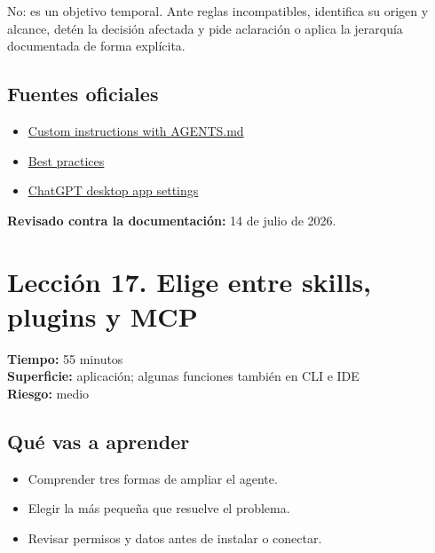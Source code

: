 \documentclass[10pt,a4paper,openany]{book}
\providecommand{\tightlist}{\setlength{\itemsep}{0.18em}\setlength{\parskip}{0pt}}
\begin{document}
No: es un objetivo temporal. Ante reglas incompatibles, identifica su
origen y alcance, detén la decisión afectada y pide aclaración o aplica
la jerarquía documentada de forma explícita.

\subsection{Fuentes oficiales}\label{fuentes-oficiales-15}

\begin{itemize}
\tightlist
\item
  \href{https://learn.chatgpt.com/docs/agent-configuration/agents-md}{Custom
  instructions with AGENTS.md}
\item
  \href{https://learn.chatgpt.com/guides/best-practices}{Best practices}
\item
  \href{https://learn.chatgpt.com/docs/reference/settings}{ChatGPT
  desktop app settings}
\end{itemize}

\textbf{Revisado contra la documentación:} 14 de julio de 2026.

\clearpage

\section{Lección 17. Elige entre skills, plugins y
MCP}\label{lecciuxf3n-17.-elige-entre-skills-plugins-y-mcp}

\begin{metabox}

\textbf{Tiempo:} 55 minutos\\
\textbf{Superficie:} aplicación; algunas funciones también en CLI e
IDE\\
\textbf{Riesgo:} medio

\end{metabox}

\subsection{Qué vas a aprender}\label{quuxe9-vas-a-aprender-16}

\begin{itemize}
\tightlist
\item
  Comprender tres formas de ampliar el agente.
\item
  Elegir la más pequeña que resuelve el problema.
\item
  Revisar permisos y datos antes de instalar o conectar.
\end{itemize}
\end{document}
